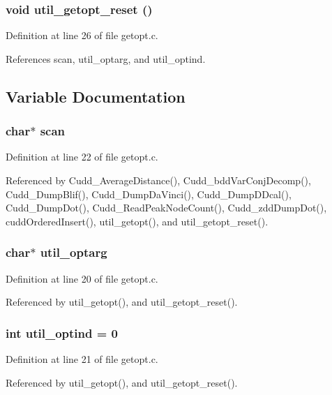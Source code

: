 \subsubsection{\setlength{\rightskip}{0pt plus 5cm}void util\_\-getopt\_\-reset ()}\label{getopt_8c_ec257d44fd9a43b46bf08a0a8ac55181}




Definition at line 26 of file getopt.c.

References scan, util\_\-optarg, and util\_\-optind.

\subsection{Variable Documentation}
\subsubsection{\setlength{\rightskip}{0pt plus 5cm}char$\ast$ \bf{scan}\hspace{0.3cm}{\tt  [static]}}\label{getopt_8c_9ce90c747c23f154610436f1b2918a0b}




Definition at line 22 of file getopt.c.

Referenced by Cudd\_\-Average\-Distance(), Cudd\_\-bdd\-Var\-Conj\-Decomp(), Cudd\_\-Dump\-Blif(), Cudd\_\-Dump\-Da\-Vinci(), Cudd\_\-Dump\-DDcal(), Cudd\_\-Dump\-Dot(), Cudd\_\-Read\-Peak\-Node\-Count(), Cudd\_\-zdd\-Dump\-Dot(), cudd\-Ordered\-Insert(), util\_\-getopt(), and util\_\-getopt\_\-reset().
\subsubsection{\setlength{\rightskip}{0pt plus 5cm}char$\ast$ \bf{util\_\-optarg}}\label{getopt_8c_4a5a7da622619534ee4d796fc6a89c5f}




Definition at line 20 of file getopt.c.

Referenced by util\_\-getopt(), and util\_\-getopt\_\-reset().
\subsubsection{\setlength{\rightskip}{0pt plus 5cm}int \bf{util\_\-optind} = 0}\label{getopt_8c_4dbadebf65ab1f8ac4e3ea19f5108bb6}




Definition at line 21 of file getopt.c.

Referenced by util\_\-getopt(), and util\_\-getopt\_\-reset().